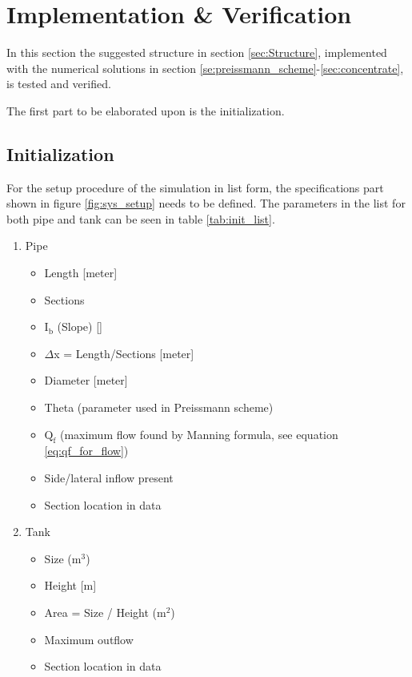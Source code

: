 \section{Implementation \& Verification}\label{sec:implementation_and_verfication}

In this section the suggested structure in section \ref{sec:Structure}, implemented with the numerical solutions in section \ref{se:preissmann_scheme}-\ref{sec:concentrate}, is tested and verified.

The first part to be elaborated upon is the initialization.

 \subsection*{Initialization}

For the setup procedure of the simulation in list form, the specifications part shown in figure \ref{fig:sys_setup} needs to be defined. The parameters in the list for both pipe and tank can be seen in table \ref {tab:init_list}. 

\begin{enumerate} \label{tab:init_list}
	\item Pipe
	\begin{itemize}
		\item Length [meter]
		\item Sections
		\item $\text{I}_\text{b}$ (Slope) [\textperthousand]
		\item $\Delta$x = Length/Sections [meter]
		\item Diameter [meter]
		\item Theta (parameter used in Preissmann scheme)
		\item $\text{Q}_{\text{f}}$ (maximum flow found by Manning formula, see equation \ref{eq:qf_for_flow}) 
		\item Side/lateral inflow present 
		\item Section location in data 
	\end{itemize}
	\item Tank
	\begin{itemize}
		\item Size ($\text{m}^\text{3}$)
		\item Height [m]
		\item Area = Size / Height ($\text{m}^\text{2}$)
		\item Maximum outflow
		\item Section location in data 
	\end{itemize}
\end{enumerate}

